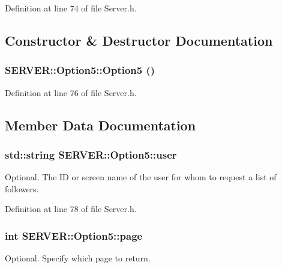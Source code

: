 Definition at line 74 of file Server.h.

\subsection{Constructor \& Destructor Documentation}
\hypertarget{structSERVER_1_1Option5_7d84350b26df14847f34a16682d4e265}{
\subsubsection{\setlength{\rightskip}{0pt plus 5cm}SERVER::Option5::Option5 ()}}
\label{structSERVER_1_1Option5_7d84350b26df14847f34a16682d4e265}




Definition at line 76 of file Server.h.

\subsection{Member Data Documentation}
\hypertarget{structSERVER_1_1Option5_edba226344f8de6938f0ee804cb5fe10}{
\subsubsection{\setlength{\rightskip}{0pt plus 5cm}std::string {\bf SERVER::Option5::user}}}
\label{structSERVER_1_1Option5_edba226344f8de6938f0ee804cb5fe10}


Optional. The ID or screen name of the user for whom to request a list of followers. 



Definition at line 78 of file Server.h.\hypertarget{structSERVER_1_1Option5_629b118bef583584f946c6acea5909e9}{
\subsubsection{\setlength{\rightskip}{0pt plus 5cm}int {\bf SERVER::Option5::page}}}
\label{structSERVER_1_1Option5_629b118bef583584f946c6acea5909e9}


Optional. Specify which page to return. 



